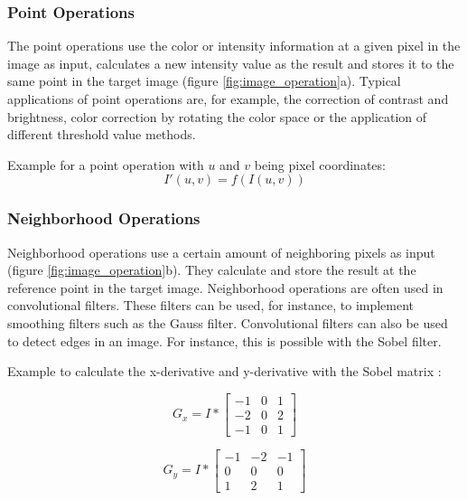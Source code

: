 \subsubsection*{Point Operations}
The point operations use the color or intensity information at a given pixel in the image as input, calculates a new intensity value as the result and stores it to the same point in the target image (figure \ref{fig:image_operation}a). Typical applications of point operations are, for example, the correction of contrast and brightness, color correction by rotating the color space or the application of different threshold value methods.

Example for a point operation with $u$ and $v$ being pixel coordinates:
\begin{equation}
    I'(u, v) = f(I(u, v))
    \label{eq:point_operation}
\end{equation}


\subsubsection*{Neighborhood Operations} \label{ch:th:neighborhood}
Neighborhood operations use a certain amount of neighboring pixels as input (figure \ref{fig:image_operation}b).
They calculate and store the result at the reference point in the
target image. Neighborhood operations are often used in convolutional filters.
These
filters can be used, for instance, to implement smoothing filters such as the
Gauss filter. Convolutional filters can also be used to detect edges in an
image. For instance, this is possible with the Sobel filter.

Example to calculate the x-derivative and y-derivative with the Sobel matrix \cite{sobel_matrix}:

\noindent\begin{minipage}{.5\linewidth}
\begin{equation}
    G_{x} = I * \begin{bmatrix}
                -1 & 0 & 1 \\ 
                -2 & 0 & 2 \\ 
                -1 & 0 & 1
                \end{bmatrix}
    \label{eq:neighborhood_operation1}
\end{equation}

\end{minipage}%
\begin{minipage}{.5\linewidth}

\begin{equation}
    G_{y} = I * \begin{bmatrix}
                -1 & -2 & -1 \\ 
                0 & 0 & 0 \\ 
                1 & 2 & 1
                \end{bmatrix}
    \label{eq:neighborhood_operation2}
\end{equation} 

\end{minipage}\\
\vspace{1ex}

